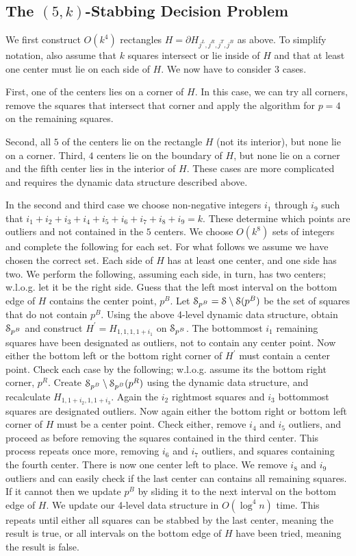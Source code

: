 \documentclass[11pt]{myclass}
\newcommand{\EuS}{\ensuremath{\EuScript{S}}}
\begin{document}
\subsection{The $(5,k)$-Stabbing Decision Problem}
We first construct $O(k^4)$ rectangles $H = \partial H_{j^L, j^R, j^T, j^B}$ as above.  To simplify notation, also assume that $k$ squares intersect or lie inside of $H$ and that at least one center must lie on each side of $H$.  We now have to consider $3$ cases.  

First, one of the centers lies on a corner of $H$.  In this case, we can try all corners, remove the squares that intersect that corner and apply the algorithm for $p=4$ on the remaining squares.  

Second, all $5$ of the centers lie on the rectangle $H$ (not its interior), but none lie on a corner.  
Third, $4$ centers lie on the boundary of $H$, but none lie on a corner and the fifth center lies in the interior of $H$.  
These cases are more complicated and requires the dynamic data structure described above.




In the second and third case we choose non-negative integers $i_1$ through $i_9$ such that $i_1 + i_2 + i_3 + i_4 + i_5 + i_6 + i_7 + i_8 + i_9 = k$.  These determine which points are outliers and not contained in the $5$ centers.  We choose $O(k^8)$ sets of integers and complete the following for each set.  For what follows we assume we have chosen the correct set.  
Each side of $H$ has at least one center, and one side has two.  We perform the following, assuming each side, in turn, has two centers; w.l.o.g. let it be the right side.
Guess that the left most interval on the bottom edge of $H$ contains the center point, $p^B$.  
Let $\EuS_{p^B} = \EuS \setminus \EuS(p^B)$ be the set of squares that do not contain $p^B$.  Using the above 4-level dynamic data structure, obtain $\EuS_{p^B}$ and construct $H^\prime = H_{1, 1, 1, 1+i_1}$ on $\EuS_{p^B}$.  The bottommost $i_1$ remaining squares have been designated as outliers, not to contain any center point.  
Now either the bottom left or the bottom right corner of $H^\prime$ must contain a center point.  
Check each case by the following; w.l.o.g. assume its the bottom right corner, $p^R$.  Create $\EuS_{p^B} \setminus \EuS_{p^B}(p^R)$ using the dynamic data structure, and recalculate $H_{1, 1+i_2, 1, 1+i_3}$.  
Again the $i_2$ rightmost squares and $i_3$ bottommost squares are designated outliers.  
Now again either the bottom right or bottom left corner of $H$ must be a center point.  Check either, remove $i_4$ and $i_5$ outliers, and proceed as before removing the squares contained in the third center.  
This process repeats once more, removing $i_6$ and $i_7$ outliers, and squares containing the fourth center.  There is now one center left to place.  We remove $i_8$ and $i_9$ outliers and can easily check if the last center can contains all remaining squares.  If it cannot then we update $p^B$ by sliding it to the next interval on the bottom edge of $H$.  We update our 4-level data structure in $O(\log^4 n)$ time.  This repeats until either all squares can be stabbed by the last center, meaning the result is true, or all intervals on the bottom edge of $H$ have been tried, meaning the result is false.  
\end{document}

